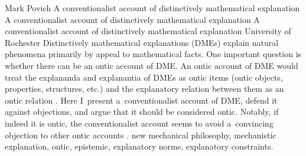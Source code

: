 \begin{artengenv}{Mark Povich}
	{A conventionalist account of distinctively mathematical explanation}
	{A conventionalist account of distinctively mathematical explanation}
	{A conventionalist account of distinctively mathematical explanation}
	{University of Rochester}
	{Distinctively mathematical explanations (DMEs) explain natural phenomena primarily by appeal to mathematical facts. One important question is whether there can be an ontic account of DME. An ontic account of DME would treat the explananda and explanantia of DMEs as ontic items (ontic objects, properties, structures, etc.) and the explanatory relation between them as an ontic relation
	\parencites[e.g.,][]{pincock_abstract_2015}[][]{povich_narrow_2021}.
	 Here I~present a~conventionalist account of DME, defend it against objections, and argue that it should be considered ontic. Notably, if indeed it is ontic, the conventionalist account seems to avoid a~convincing objection to other ontic accounts 
	\parencite[][]{kuorikoski_there_2021}.%
	}
	{new mechanical philosophy, mechanistic explanation, ontic, epistemic, explanatory norms, explanatory constraints.}





\end{artengenv}
